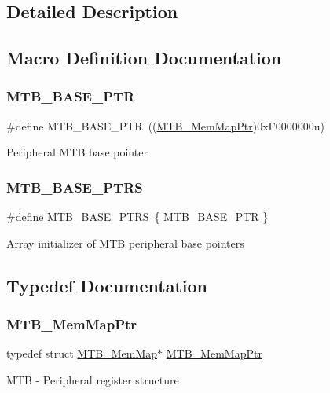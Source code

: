 \subsection{Detailed Description}


\subsection{Macro Definition Documentation}
\mbox{\label{group___m_t_b___peripheral_gadf7f362dfa67354951e6a23ddf08cd73}} 
\subsubsection{\texorpdfstring{M\+T\+B\+\_\+\+B\+A\+S\+E\+\_\+\+P\+TR}{MTB\_BASE\_PTR}}
{\footnotesize\ttfamily \#define M\+T\+B\+\_\+\+B\+A\+S\+E\+\_\+\+P\+TR~((\hyperlink{group___m_t_b___peripheral_ga2d3d13148d5c08e92b1ad2eeb14342da}{M\+T\+B\+\_\+\+Mem\+Map\+Ptr})0x\+F0000000u)}

Peripheral M\+TB base pointer \mbox{\label{group___m_t_b___peripheral_ga45b3138a9794fd8f2c7613b48646e44f}} 
\subsubsection{\texorpdfstring{M\+T\+B\+\_\+\+B\+A\+S\+E\+\_\+\+P\+T\+RS}{MTB\_BASE\_PTRS}}
{\footnotesize\ttfamily \#define M\+T\+B\+\_\+\+B\+A\+S\+E\+\_\+\+P\+T\+RS~\{ \hyperlink{group___m_t_b___peripheral_gadf7f362dfa67354951e6a23ddf08cd73}{M\+T\+B\+\_\+\+B\+A\+S\+E\+\_\+\+P\+TR} \}}

Array initializer of M\+TB peripheral base pointers 

\subsection{Typedef Documentation}
\mbox{\label{group___m_t_b___peripheral_ga2d3d13148d5c08e92b1ad2eeb14342da}} 
\subsubsection{\texorpdfstring{M\+T\+B\+\_\+\+Mem\+Map\+Ptr}{MTB\_MemMapPtr}}
{\footnotesize\ttfamily typedef struct \hyperlink{struct_m_t_b___mem_map}{M\+T\+B\+\_\+\+Mem\+Map}$\ast$ \hyperlink{group___m_t_b___peripheral_ga2d3d13148d5c08e92b1ad2eeb14342da}{M\+T\+B\+\_\+\+Mem\+Map\+Ptr}}

M\+TB -\/ Peripheral register structure 